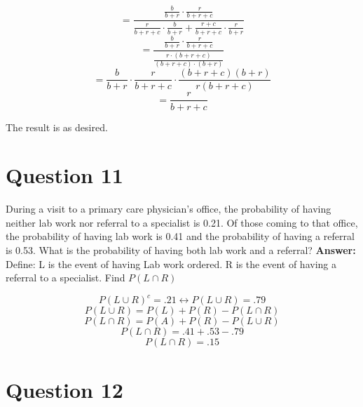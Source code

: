 \documentclass[svgnames]{article}
\begin{document}
$$=\frac{\frac{b}{b+r}\cdot\frac{r}{b+r+c}}{\frac{r}{b+r+c}\cdot\frac{b}{b+r}+\frac{r+c}{b+r+c}\cdot\frac{r}{b+r}}$$
$$=\frac{\frac{b}{b+r}\cdot\frac{r}{b+r+c}}{\frac{r\cdot(b+r+c)}{(b+r+c)\cdot(b+r)}}$$
$$=\frac{b}{b+r}\cdot\frac{r}{b+r+c}\cdot \frac{(b+r+c)(b+r)}{r(b+r+c)}$$
$$=\frac{r}{b+r+c}$$ 

The result is as desired.

\section{Question 11}
During a visit to a primary care physician's office, the probability of having neither lab work
nor referral to a specialist is 0.21. Of those coming to that office, the probability of having lab
work is 0.41 and the probability of having a referral is 0.53. What is the probability of having
both lab work and a referral?
\textbf{Answer:}
\newline
\newline
Define:
\newline
L is the event of having Lab work ordered.
\newline
R is the event of having a referral to a specialist.
\newline
Find $P(L\cap R)$

$$P(L\cup R)^c = .21 \leftrightarrow  P(L\cup R) = .79$$
$$P(L\cup R) = P(L) + P(R) - P(L\cap R) $$
$$P(L\cap R) = P(A) + P(R) - P(L\cup R)$$
$$P(L\cap R) = .41 + .53 - .79$$
$$P(L\cap R) = .15$$


\section{Question 12}
\end{document}
